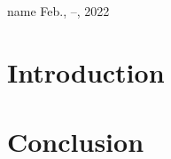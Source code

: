 \documentclass[10pt,a4]{article}
\begin{document}
%
{name}%
{Feb., --, 2022}

\section{Introduction}

\section{Conclusion}
\cite{sample1}
\cite{sample4}


%

%

\end{document}

